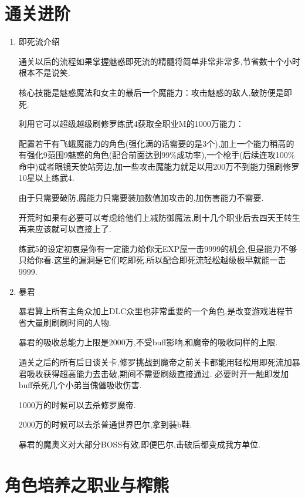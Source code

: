 \newpage

\section{通关进阶}

\begin{enumerate}

	\item{即死流介绍}

	通关以后的流程如果掌握魅惑即死流的精髓将简单非常非常多,节省数十个小时根本不是说笑.

	核心技能是魅惑魔法和女主的最后一个魔能力：攻击魅惑的敌人,破防便是即死.

	利用它可以超级越级刷修罗练武4获取全职业M的1000万能力：

	配置若干有飞蛾魔能力的角色(强化满的话需要的是3个),加上一个能力稍高的有强化9范围9魅惑的角色(配合前面达到99\%成功率),一个枪手(后续连攻100\%命中)或者眼镜天使站旁边,加一些攻击魔能力就足以用200万不到能力强刷修罗10星以上练武4.

	由于只需要破防,魔能力只需要装加数值加攻击的,加伤害能力不需要.

	开荒时如果有必要可以考虑给他们上减防御魔法,刷十几个职业后去四天王转生再来应该就可以直接上了.

	练武5的设定初衷是你有一定能力给你无EXP屋一击9999的机会,但是能力不够只给你看.这里的漏洞是它们吃即死.所以配合即死流轻松越级极早就能一击9999.


	\item{暴君}

	暴君算上所有主角众加上DLC众里也非常重要的一个角色,是改变游戏进程节省大量刷刷刷时间的人物.

	暴君的吸收总能力上限是2000万,不受buff影响,和魔帝的吸收同样的上限.

	通关之后的所有后日谈关卡,修罗挑战到魔帝之前关卡都能用轻松用即死流加暴君吸收获得超高能力去击破,期间不需要刷级直接通过.
	必要时开一触即发加buff杀死几个小弟当傀儡吸收伤害.

	1000万的时候可以去杀修罗魔帝.

	2000万的时候可以去杀普通世界巴尔,拿到装b鞋.

	暴君的魔奥义对大部分BOSS有效,即便巴尔,击破后都变成我方单位.


\end{enumerate}

\newpage

\section{角色培养之职业与榨熊}


